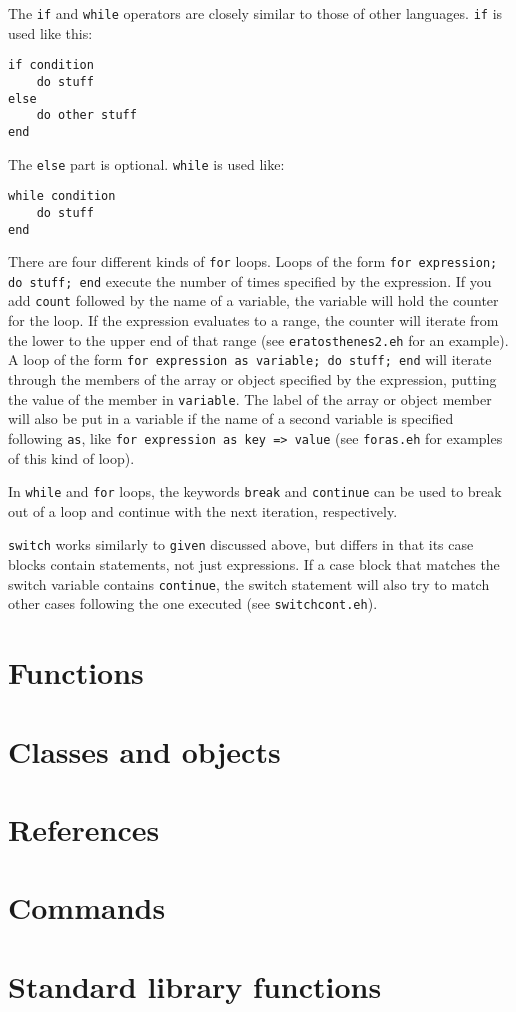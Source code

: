 \documentclass{article}
\begin{document}
The \verb#if# and \verb#while# operators are closely similar to those of other languages. 
\verb#if# is used like this:
\begin{verbatim}
if condition
	do stuff
else
	do other stuff
end
\end{verbatim}
The \verb#else# part is optional.
\verb#while# is used like:
\begin{verbatim}
while condition
	do stuff
end
\end{verbatim}

There are four different kinds of \verb#for# loops. 
Loops of the form \verb#for expression; do stuff; end# execute the number of times specified by the expression.
If you add \verb#count# followed by the name of a variable, the variable will hold the counter for the loop. 
If the expression evaluates to a range, the counter will iterate from the lower to the upper end of that range (see \verb#eratosthenes2.eh# for an example).
A loop of the form \verb#for expression as variable; do stuff; end# will iterate through the members of the array or object specified by the expression, putting the value of the member in \verb#variable#.
The label of the array or object member will also be put in a variable if the name of a second variable is specified following \verb#as#, like \verb#for expression as key => value# (see \verb#foras.eh# for examples of this kind of loop).

In \verb#while# and \verb#for# loops, the keywords \verb#break# and \verb#continue# can be used to break out of a loop and continue with the next iteration, respectively.

\verb#switch# works similarly to \verb#given# discussed above, but differs in that its case blocks contain statements, not just expressions. 
If a case block that matches the switch variable contains \verb#continue#, the switch statement will also try to match other cases following the one executed (see \verb#switchcont.eh#).

\section{Functions}

\section{Classes and objects}

\section{References}

\section{Commands}

\section{Standard library functions}
\end{document}
